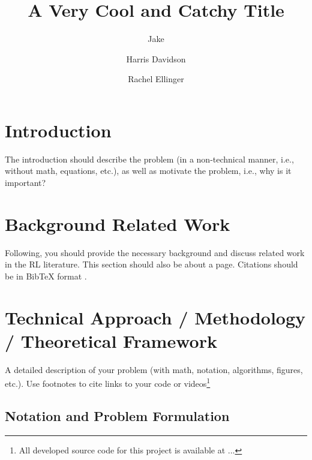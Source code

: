 \documentclass{article}
\title{A Very Cool and Catchy Title}
\author{Jake \and Harris Davidson \and Rachel Ellinger}
\date{\vspace{-1em}}
\begin{document}
\maketitle


\section{Introduction}

The introduction should describe the problem (in a non-technical manner, i.e., without math, equations, etc.), as well as motivate the problem, i.e., why is it important?

\section{Background Related Work}

Following, you should provide the necessary background and discuss related work in the RL literature. This section should also be about a page. Citations should be in BibTeX format \citep{thrun2005probabilistic}.

\section{Technical Approach / Methodology / Theoretical Framework}



A detailed description of your problem (with math, notation, algorithms, figures, etc.). Use footnotes to cite links to your code or videos\footnote{All developed source code for this project is available at ...}

\subsection{Notation and Problem Formulation}
\end{document}

